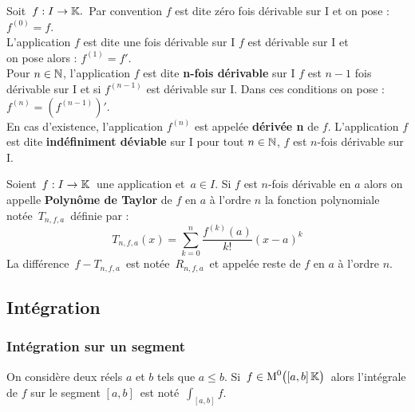 Soit \(\, f:I\to \mathbb{K}.\,\) Par convention $f$ est dite zéro fois dérivable sur I et on pose : $f^{(0)}=f$.\vspace{0.1cm}\\
L'application $f$ est dite une fois dérivable sur I \ssi $f$ est dérivable sur I et\\
on pose alors : $f^{(1)}=f'$.\vspace{0.1cm}\\
Pour \(n\in \mathbb{N}\)\expo{*}, l'application $f$ est dite \textbf{n-fois dérivable} sur I \ssi $f$ est $n-1$ fois dérivable sur I et si $f^{(n-1)}$ est dérivable sur I. Dans ces conditions on pose : \(f^{(n)}=\left(f^{(n-1)}\right)'.\)\vspace{0.1cm}\\
En cas d'existence, l'application $f^{(n)}$ est appelée \textbf{dérivée n} de $f$. L'application $f$ est dite \textbf{indéfiniment déviable} sur I \ssi pour tout \(n\in \mathbb{N}\), $f$ est $n$-fois dérivable sur I. 

\vspace{1.3cm}

Soient \(\,f:I\to \mathbb{K}\,\) une application et \(\,a\in I\). Si $f$ est $n$-fois dérivable en $a$ alors on appelle \textbf{Polynôme de Taylor} de $f$ en $a$ à l'ordre $n$ la fonction polynomiale notée $\,T_{n,f,a}\,$ définie par : \vspace{-0.1cm}
\[T_{n,f,a}(x)=\sum_{k=0}^n\frac{f^{(k)}(a)}{k!}(x-a)^k\]
La différence \(\,f-T_{n,f,a}\,\) est notée \(\,R_{n,f,a}\,\) et appelée reste de $f$ en $a$ à l'ordre $n$.

\vspace{2cm}

\subsection{Intégration}

\vspace{1cm}

\subsubsection{Intégration sur un segment}

\vspace{1cm}

On considère deux réels $a$ et $b$ tels que $a\leq b$. Si \(\,f\in \text{M}^0\bigl([a,b]\,\mathbb{K}\bigr)\,\) alors l'intégrale de $f$ sur le segment \([a,b]\,\) est noté \(\,\displaystyle\int_{[a,b]}\!f\).

